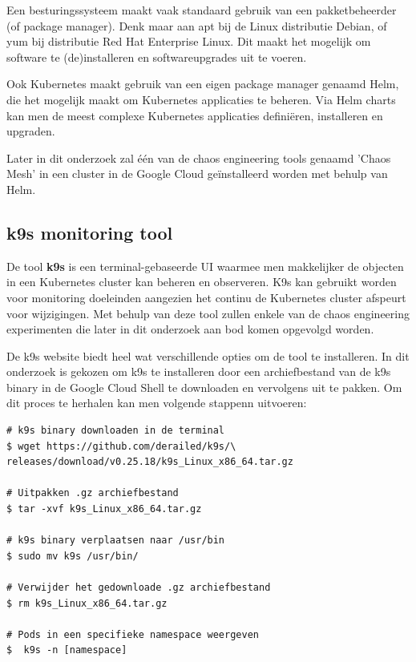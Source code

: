 Een besturingssysteem maakt vaak standaard gebruik van een pakketbeheerder (of package manager). Denk maar aan apt bij de Linux distributie Debian, of yum bij distributie Red Hat Enterprise Linux. Dit maakt het mogelijk om software te (de)installeren en softwareupgrades uit te voeren.

Ook Kubernetes maakt gebruik van een eigen package manager genaamd Helm, die het mogelijk maakt om Kubernetes applicaties te beheren. Via Helm charts kan men de meest complexe Kubernetes applicaties definiëren, installeren en upgraden.

Later in dit onderzoek zal één van de chaos engineering tools genaamd 'Chaos Mesh' in een cluster in de Google Cloud geïnstalleerd worden met behulp van Helm.  

\subsection{k9s monitoring tool}
\label{subsec:k9s} 

De tool {\bf k9s} is een terminal-gebaseerde UI waarmee men makkelijker de objecten in een Kubernetes cluster kan beheren en observeren. K9s kan gebruikt worden voor monitoring doeleinden aangezien het continu de Kubernetes cluster afspeurt voor wijzigingen. Met behulp van deze tool zullen enkele van de chaos engineering experimenten die later in dit onderzoek aan bod komen opgevolgd worden.

De k9s website biedt heel wat verschillende opties om de tool te installeren. \autocite{K9s2022}
\newline In dit onderzoek is gekozen om k9s te installeren door een archiefbestand van de k9s binary in de Google Cloud Shell te downloaden en vervolgens uit te pakken. Om dit proces te herhalen kan men volgende stappenn uitvoeren: 
\begin{lstlisting}
# k9s binary downloaden in de terminal
$ wget https://github.com/derailed/k9s/\
releases/download/v0.25.18/k9s_Linux_x86_64.tar.gz

# Uitpakken .gz archiefbestand
$ tar -xvf k9s_Linux_x86_64.tar.gz

# k9s binary verplaatsen naar /usr/bin
$ sudo mv k9s /usr/bin/

# Verwijder het gedownloade .gz archiefbestand
$ rm k9s_Linux_x86_64.tar.gz

# Pods in een specifieke namespace weergeven
$  k9s -n [namespace]
    
\end{lstlisting} 

